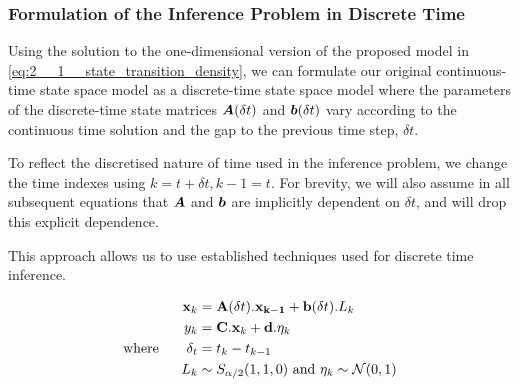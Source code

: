 \documentclass[../main.tex]{subfiles}
\begin{document}
\subsubsection{Formulation of the Inference Problem in Discrete Time}

Using the solution to the one-dimensional version of the proposed model in \autoref{eq:2__1__state_transition_density}, we can formulate our original continuous-time state space model as a discrete-time state space model where the parameters of the discrete-time state matrices $\bm{A}(\delta t)$ and $\bm{b}(\delta t)$ vary according to the continuous time solution and the gap to the previous time step, $\delta t$. 

To reflect the discretised nature of time used in the inference problem, we change the time indexes using $k = t + \delta t, k-1 = t$. For brevity, we will also assume in all subsequent equations that $\bm{A}$ and $\bm{b}$ are implicitly dependent on $\delta t$, and will drop this explicit dependence. 

This approach allows us to use established techniques used for discrete time inference. 

\begin{align}
    \mathbf{x}_k & = \mathbf{A}(\delta t) . \mathbf{x_{k-1}} + \mathbf{b}( \delta t) . L_k \notag\\
    y_k & = \mathbf{C} . \mathbf{x}_k + \mathbf{d} . \mathbf{\eta}_k \\
    \text{where} \qquad \delta_t & = t_k - t_{k-1} \notag \\
    L_k & \sim S_{\alpha/2}(1,1,0) \text{  and  } \eta_k \sim \mathcal{N}(0,1) \notag
\end{align}
\end{document}

